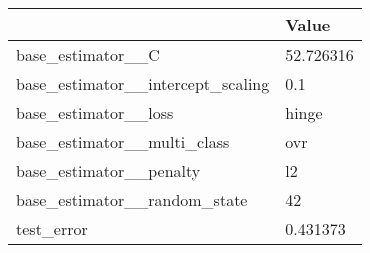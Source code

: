 \begin{tabular}{ll}
\toprule
{} &      Value \\
\midrule
base\_estimator\_\_C                 &  52.726316 \\
base\_estimator\_\_intercept\_scaling &        0.1 \\
base\_estimator\_\_loss              &      hinge \\
base\_estimator\_\_multi\_class       &        ovr \\
base\_estimator\_\_penalty           &         l2 \\
base\_estimator\_\_random\_state      &         42 \\
test\_error                        &   0.431373 \\
\bottomrule
\end{tabular}
